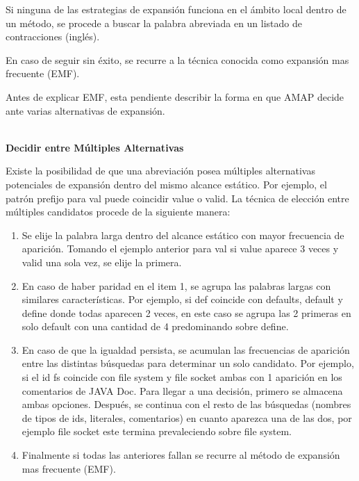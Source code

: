 \documentclass[a4paper,12pt]{report}
\begin{document}
Si ninguna de las estrategias de expansión funciona en el ámbito local dentro de un método, se procede a buscar la palabra abreviada en un listado de contracciones (inglés).

En caso de seguir sin éxito, se recurre a la técnica conocida como expansión mas frecuente (EMF). 

Antes de explicar EMF, esta pendiente describir la forma en que AMAP decide ante varias alternativas de expansión.

\noindent \textbf{\\Decidir entre Múltiples Alternativas\\}

Existe la posibilidad de que una abreviación posea múltiples alternativas potenciales de expansión dentro del mismo alcance estático. Por ejemplo, el patrón prefijo para \textsf{val} puede coincidir \textsf{value} o \textsf{valid}. La técnica de elección entre múltiples candidatos procede de la siguiente manera:

\begin{enumerate}
\itemsep0em%
\item Se elije la palabra larga dentro del alcance estático con mayor frecuencia de aparición. Tomando el ejemplo anterior para \textsf{val} si \textsf{value} aparece 3 veces y \textsf{valid} una sola vez, se elije la primera.

\item En caso de haber paridad en el item 1, se agrupa las palabras largas con similares características. Por ejemplo, si \textsf{def} coincide con \textsf{defaults}, \textsf{default} y \textsf{define} donde todas aparecen 2 veces, en este caso se agrupa las 2 primeras en solo \textsf{default} con una cantidad de 4 predominando sobre \textsf{define}.

\item En caso de que la igualdad persista, se acumulan las frecuencias de aparición entre las distintas búsquedas para determinar un solo candidato. Por ejemplo, si el id \textsf{fs} coincide con \textsf{file system} y \textsf{file socket} ambas con 1 aparición en los comentarios de JAVA Doc. Para llegar a una decisión, primero se almacena ambas opciones. Después, se continua con el resto de las búsquedas (nombres de tipos de ids, literales, comentarios) en cuanto aparezca una de las dos, por ejemplo \textsf{file socket} este termina prevaleciendo sobre \textsf{file system}.

\item Finalmente si todas las anteriores fallan se recurre al método de expansión mas frecuente (EMF). 

\end{enumerate}
\end{document}
